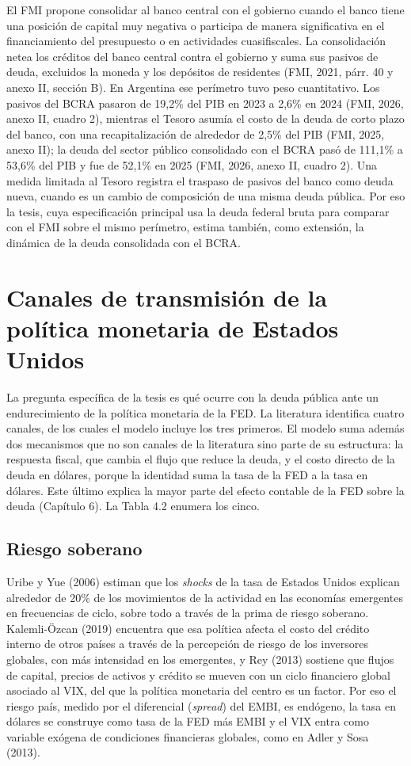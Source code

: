 El FMI propone consolidar al banco central con el gobierno cuando el
banco tiene una posición de capital muy negativa o participa de manera
significativa en el financiamiento del presupuesto o en actividades
cuasifiscales. La consolidación netea los créditos del banco central
contra el gobierno y suma sus pasivos de deuda, excluidos la moneda y
los depósitos de residentes (FMI, 2021, párr. 40 y anexo II, sección B).
En Argentina ese perímetro tuvo peso cuantitativo. Los pasivos del BCRA
pasaron de 19,2\% del PIB en 2023 a 2,6\% en 2024 (FMI, 2026, anexo II,
cuadro 2), mientras el Tesoro asumía el costo de la deuda de corto plazo
del banco, con una recapitalización de alrededor de 2,5\% del PIB (FMI,
2025, anexo II); la deuda del sector público consolidado con el BCRA
pasó de 111,1\% a 53,6\% del PIB y fue de 52,1\% en 2025 (FMI, 2026,
anexo II, cuadro 2). Una medida limitada al Tesoro registra el traspaso
de pasivos del banco como deuda nueva, cuando es un cambio de
composición de una misma deuda pública. Por eso la tesis, cuya
especificación principal usa la deuda federal bruta para comparar con el
FMI sobre el mismo perímetro, estima también, como extensión, la
dinámica de la deuda consolidada con el BCRA.

\section{Canales de transmisión de la política monetaria de Estados
Unidos}

La pregunta específica de la tesis es qué ocurre con la deuda pública
ante un endurecimiento de la política monetaria de la FED. La literatura
identifica cuatro canales, de los cuales el modelo incluye los tres
primeros. El modelo suma además dos mecanismos que no son canales de la
literatura sino parte de su estructura: la respuesta fiscal, que cambia
el flujo que reduce la deuda, y el costo directo de la deuda en dólares,
porque la identidad suma la tasa de la FED a la tasa en dólares. Este
último explica la mayor parte del efecto contable de la FED sobre la
deuda (Capítulo 6). La Tabla 4.2 enumera los cinco.

\subsection{Riesgo soberano}

Uribe y Yue (2006) estiman que los \emph{shocks} de la tasa de Estados
Unidos explican alrededor de 20\% de los movimientos de la actividad en
las economías emergentes en frecuencias de ciclo, sobre todo a través de
la prima de riesgo soberano. Kalemli-Özcan (2019) encuentra que esa
política afecta el costo del crédito interno de otros países a través de
la percepción de riesgo de los inversores globales, con más intensidad
en los emergentes, y Rey (2013) sostiene que flujos de capital, precios
de activos y crédito se mueven con un ciclo financiero global asociado
al VIX, del que la política monetaria del centro es un factor. Por eso
el riesgo país, medido por el diferencial (\emph{spread}) del EMBI, es
endógeno, la tasa en dólares se construye como tasa de la FED más EMBI y
el VIX entra como variable exógena de condiciones financieras globales,
como en Adler y Sosa (2013).

